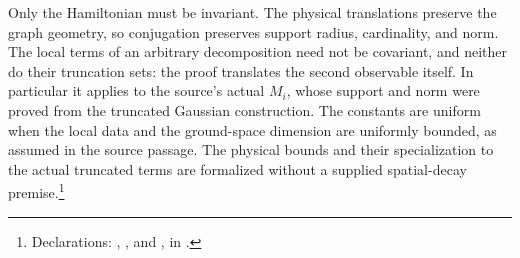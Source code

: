 \documentclass{article}
\begin{document}
Only the Hamiltonian must be invariant. The physical translations
preserve the graph geometry, so conjugation preserves support radius,
cardinality, and norm. The local terms of an arbitrary decomposition
need not be covariant, and neither do their truncation sets: the proof
translates the second observable itself. In particular it applies to
the source's actual $M_i$, whose support and norm were proved from the
truncated Gaussian construction. The constants are uniform when the
local data and the ground-space dimension are uniformly bounded, as
assumed in the source passage.
The physical bounds and their specialization to the
actual truncated terms are formalized without a supplied spatial-decay
premise.\footnote{Declarations:
,
, and
,
in .}



\end{document}
